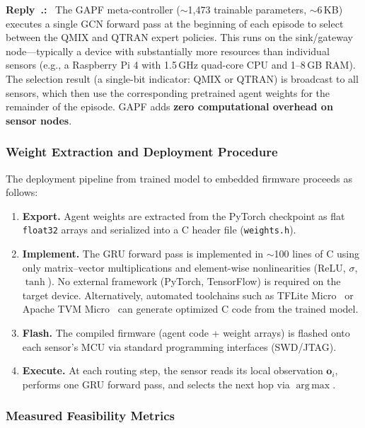 \documentclass[11pt]{article}
\newcounter{reviewer}
\newcounter{point}[reviewer]
\newcounter{replyctr}[reviewer]
\renewcommand{\thereplyctr}{\thereviewer.\arabic{replyctr}}
\newenvironment{reply}
  {\refstepcounter{replyctr}%
   \addtocounter{replyctr}{-1}%
   \medskip\noindent
   \begin{sf}\textbf{Reply~\thereplyctr:}\ }
  {\addtocounter{replyctr}{1}%
   \medskip\end{sf}}
\DeclareMathOperator*{\argmax}{arg\,max}
\begin{document}
\begin{refsection}
\begin{mdframed}[style=Resp]
\begin{reply}
The GAPF meta-controller ($\sim$1{,}473 trainable parameters, $\sim$6\,KB)
executes a single GCN forward pass at the beginning of each episode to select
between the QMIX and QTRAN expert policies. This runs on the sink/gateway
node---typically a device with substantially more resources than individual
sensors (e.g., a Raspberry Pi 4 with 1.5\,GHz quad-core CPU and 1--8\,GB RAM).
The selection result (a single-bit indicator: QMIX or QTRAN) is broadcast to all
sensors, which then use the corresponding pretrained agent weights for the
remainder of the episode. GAPF adds \textbf{zero computational overhead on
sensor nodes}.

\subsubsection{Weight Extraction and Deployment Procedure}

The deployment pipeline from trained model to embedded firmware proceeds as follows:

\begin{enumerate}[nosep]
    \item \textbf{Export.} Agent weights are extracted from the PyTorch
          checkpoint as flat \texttt{float32} arrays and serialized into a C
          header file (\texttt{weights.h}).
    \item \textbf{Implement.} The GRU forward pass is implemented in
          $\sim$100 lines of C using only matrix--vector multiplications and
          element-wise nonlinearities ($\mathrm{ReLU}$, $\sigma$, $\tanh$).
          No external framework (PyTorch, TensorFlow) is required on the
          target device. Alternatively, automated toolchains such as TFLite
          Micro~\cite{david2021tensorflow} or Apache TVM
          Micro~\cite{chen2018tvm} can generate optimized C code from the
          trained model.
    \item \textbf{Flash.} The compiled firmware (agent code + weight arrays)
          is flashed onto each sensor's MCU via standard programming
          interfaces (SWD/JTAG).
    \item \textbf{Execute.} At each routing step, the sensor reads its local
          observation $\mathbf{o}_i$, performs one GRU forward pass, and
          selects the next hop via $\argmax$.
\end{enumerate}

\subsubsection{Measured Feasibility Metrics}


\end{reply}
\end{mdframed}
\end{refsection}
\end{document}
